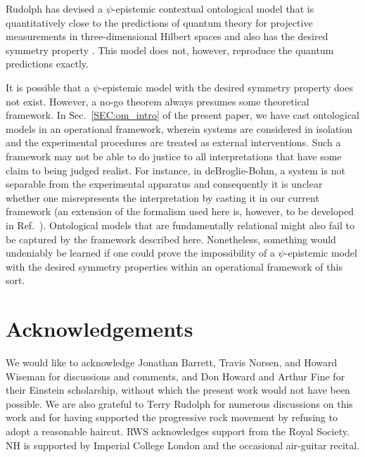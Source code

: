 \documentclass[aps,nofootinbib,12pt]{revtex4}
\begin{document}
Rudolph has devised a $\psi$-epistemic contextual ontological model
that is quantitatively close to the predictions of quantum theory
for projective measurements in three-dimensional Hilbert spaces and
also has the desired symmetry property \cite{tr_model}. This model
does not, however, reproduce the quantum predictions exactly.

It is possible that a $\psi$-epistemic model with the desired
symmetry property does not exist.  However, a no-go theorem always
presumes some theoretical framework. In Sec.~\ref{SEC:om_intro} of
the present paper, we have cast ontological models in an operational
framework, wherein systems are considered in isolation and the
experimental procedures are treated as external interventions. Such
a framework may not be able to do justice to all interpretations
that have some claim to being judged realist. For instance, in
deBroglie-Bohm, a system is not separable from the experimental
apparatus and consequently it is unclear whether one misrepresents
the interpretation by casting it in our current framework (an
extension of the formalism used here is, however, to be developed in
Ref.~\cite{deficiency}). Ontological models that are fundamentally
relational might also fail to be captured by the framework described
here. Nonetheless, something would undeniably be learned if one
could prove the impossibility of a $\psi$-epistemic model with the
desired symmetry properties within an operational framework of this
sort.

\section{Acknowledgements}

We would like to acknowledge Jonathan Barrett, Travis Norsen, and
Howard Wiseman for discussions and comments, and Don Howard and
Arthur Fine for their Einstein scholarship, without which the
present work would not have been possible. We are also grateful to
Terry Rudolph for numerous discussions on this work and for having
supported the progressive rock movement by refusing to adopt a
reasonable haircut. RWS acknowledges support from the Royal Society.
NH is supported by Imperial College London and the occasional
air-guitar recital.
\end{document}
